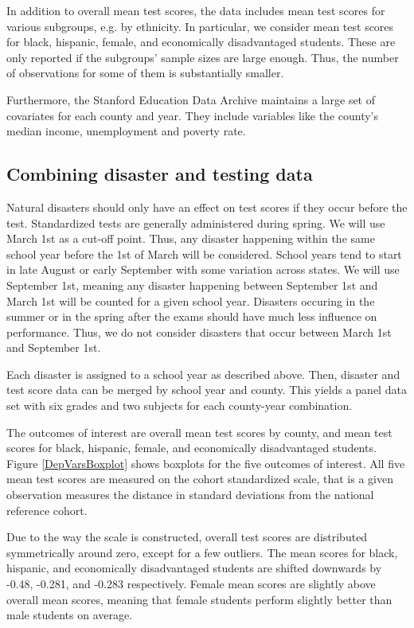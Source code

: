 In addition to overall mean test scores, the data includes mean test scores for various subgroups, e.g. by ethnicity. In particular, we consider mean test scores for black, hispanic, female, and economically disadvantaged students. These are only reported if the subgroups' sample sizes are large enough. Thus, the number of observations for some of them is substantially smaller.

Furthermore, the Stanford Education Data Archive maintains a large set of covariates for each county and year. They include variables like the county's median income, unemployment and poverty rate.


\subsection{Combining disaster and testing data}

Natural disasters should only have an effect on test scores if they occur before the test. Standardized tests are generally administered during spring. We will use March 1st as a cut-off point. Thus, any disaster happening within the same school year before the 1st of March will be considered. School years tend to start in late August or early September with some variation across states. We will use September 1st, meaning any disaster happening between September 1st and March 1st will be counted for a given school year. Disasters occuring in the summer or in the spring after the exams should have much less influence on performance. Thus, we do not consider disasters that occur between March 1st and September 1st.

Each disaster is assigned to a school year as described above. Then, disaster and test score data can be merged by school year and county. This yields a panel data set with six grades and two subjects for each county-year combination.

The outcomes of interest are overall mean test scores by county, and mean test scores for black, hispanic, female, and economically disadvantaged students. Figure \ref{DepVarsBoxplot} shows boxplots for the five outcomes of interest. All five mean test scores are measured on the cohort standardized scale, that is a given observation measures the distance in standard deviations from the national reference cohort. 

Due to the way the scale is constructed, overall test scores are distributed symmetrically around zero, except for a few outliers. The mean scores for black, hispanic, and economically disadvantaged students are shifted downwards by -0.48, -0.281, and -0.283 respectively. Female mean scores are slightly above overall mean scores, meaning that female students perform slightly better than male students on average.

